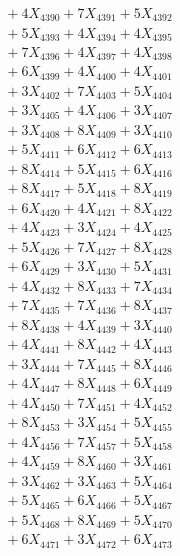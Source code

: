 \documentclass[a4paper,10pt]{article}
\begin{document}
{\begin{align}
&\;  + 4 X_{4390} + 7 X_{4391} + 5 X_{4392} \\[0.3ex]
&\;  + 5 X_{4393} + 4 X_{4394} + 4 X_{4395} \\[0.3ex]
&\;  + 7 X_{4396} + 4 X_{4397} + 4 X_{4398} \\[0.3ex]
&\;  + 6 X_{4399} + 4 X_{4400} + 4 X_{4401} \\[0.3ex]
&\;  + 3 X_{4402} + 7 X_{4403} + 5 X_{4404} \\[0.3ex]
&\;  + 3 X_{4405} + 4 X_{4406} + 3 X_{4407} \\[0.3ex]
&\;  + 3 X_{4408} + 8 X_{4409} + 3 X_{4410} \\[0.3ex]
&\;  + 5 X_{4411} + 6 X_{4412} + 6 X_{4413} \\[0.3ex]
&\;  + 8 X_{4414} + 5 X_{4415} + 6 X_{4416} \\[0.3ex]
&\;  + 8 X_{4417} + 5 X_{4418} + 8 X_{4419} \\[0.5ex]\allowbreak
&\;  + 6 X_{4420} + 4 X_{4421} + 8 X_{4422} \\[0.3ex]
&\;  + 4 X_{4423} + 3 X_{4424} + 4 X_{4425} \\[0.3ex]
&\;  + 5 X_{4426} + 7 X_{4427} + 8 X_{4428} \\[0.3ex]
&\;  + 6 X_{4429} + 3 X_{4430} + 5 X_{4431} \\[0.3ex]
&\;  + 4 X_{4432} + 8 X_{4433} + 7 X_{4434} \\[0.3ex]
&\;  + 7 X_{4435} + 7 X_{4436} + 8 X_{4437} \\[0.3ex]
&\;  + 8 X_{4438} + 4 X_{4439} + 3 X_{4440} \\[0.3ex]
&\;  + 4 X_{4441} + 8 X_{4442} + 4 X_{4443} \\[0.3ex]
&\;  + 3 X_{4444} + 7 X_{4445} + 8 X_{4446} \\[0.3ex]
&\;  + 4 X_{4447} + 8 X_{4448} + 6 X_{4449} \\[0.5ex]\allowbreak
&\;  + 4 X_{4450} + 7 X_{4451} + 4 X_{4452} \\[0.3ex]
&\;  + 8 X_{4453} + 3 X_{4454} + 5 X_{4455} \\[0.3ex]
&\;  + 4 X_{4456} + 7 X_{4457} + 5 X_{4458} \\[0.3ex]
&\;  + 4 X_{4459} + 8 X_{4460} + 3 X_{4461} \\[0.3ex]
&\;  + 3 X_{4462} + 3 X_{4463} + 5 X_{4464} \\[0.3ex]
&\;  + 5 X_{4465} + 6 X_{4466} + 5 X_{4467} \\[0.3ex]
&\;  + 5 X_{4468} + 8 X_{4469} + 5 X_{4470} \\[0.3ex]
&\;  + 6 X_{4471} + 3 X_{4472} + 6 X_{4473} \\[0.3ex]

\end{align}}
\end{document}
